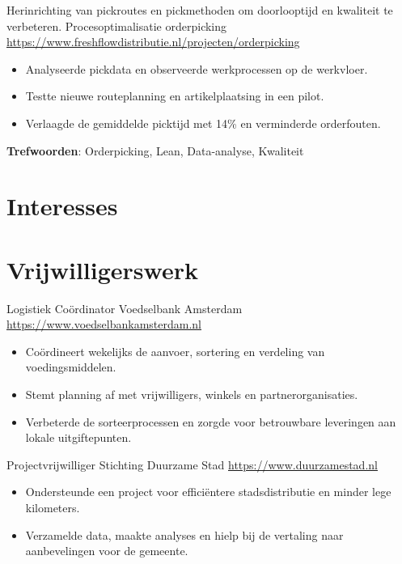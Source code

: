 \documentclass[a4paper, serif, 10pt]{moderncv}
\begin{document}
        {Herinrichting van pickroutes en pickmethoden om doorlooptijd en kwaliteit te verbeteren.}
        {Procesoptimalisatie orderpicking}
        {\url{https://www.freshflowdistributie.nl/projecten/orderpicking}}
        {}
        {\begin{itemize}
\item Analyseerde pickdata en observeerde werkprocessen op de werkvloer.
\item Testte nieuwe routeplanning en artikelplaatsing in een pilot.
\item Verlaagde de gemiddelde picktijd met 14\% en verminderde orderfouten.
\end{itemize}
\textbf{Trefwoorden}: Orderpicking, Lean, Data-analyse, Kwaliteit}
\section{Interesses}

\section{Vrijwilligerswerk}

        {Logistiek Coördinator}
        {Voedselbank Amsterdam}
        {\url{https://www.voedselbankamsterdam.nl}}
        {}
        {\begin{itemize}
\item Coördineert wekelijks de aanvoer, sortering en verdeling van voedingsmiddelen.
\item Stemt planning af met vrijwilligers, winkels en partnerorganisaties.
\item Verbeterde de sorteerprocessen en zorgde voor betrouwbare leveringen aan lokale uitgiftepunten.
\end{itemize}}
    

        {Projectvrijwilliger}
        {Stichting Duurzame Stad}
        {\url{https://www.duurzamestad.nl}}
        {}
        {\begin{itemize}
\item Ondersteunde een project voor efficiëntere stadsdistributie en minder lege kilometers.
\item Verzamelde data, maakte analyses en hielp bij de vertaling naar aanbevelingen voor de gemeente.
\end{itemize}}
    
\end{document}
